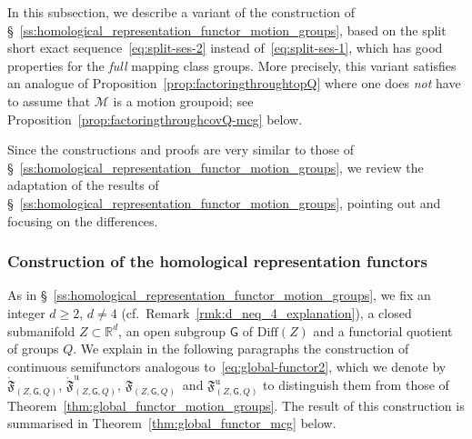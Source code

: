 \documentclass[AHL,Unicode,published]{cedram}
\newcommand{\Diff}{\mathrm{Diff}}
\newcommand{\Int}{\mathring}
\newcommand{\unt}{\mathrm{u}}
\newcommand{\fF}{\mathfrak{F}}
\newcommand{\sG}{\mathsf{G}}
\newcommand{\cM}{\mathcal{M}}
\newcommand{\bR}{\mathbb{R}}
\renewcommand{\geq}{\geqslant}
\begin{document}
In this subsection, we describe a variant of the construction of \S~\ref{ss:homological_representation_functor_motion_groups}, based on the split short exact sequence~\eqref{eq:split-ses-2} instead of~\eqref{eq:split-ses-1}, which has good properties for the \emph{full} mapping class groups. More precisely, this variant satisfies an analogue of Proposition~\ref{prop:factoringthroughtopQ} where one does \emph{not} have to assume that $\cM$ is a motion groupoid; see Proposition~\ref{prop:factoringthroughcovQ-mcg} below.

Since the constructions and proofs are very similar to those of \S~\ref{ss:homological_representation_functor_motion_groups}, we review the adaptation of the results of \S~\ref{ss:homological_representation_functor_motion_groups}, pointing out and focusing on the differences.


\subsubsection{Construction of the homological representation functors}\label{ss:construction_semifunctor_mcg}

As in \S~\ref{ss:homological_representation_functor_motion_groups}, we fix an integer $d \geq 2$, $d \neq 4$ (cf.~Remark~\ref{rmk:d_neq_4_explanation}), a closed submanifold $Z \subset \bR^d$, an open subgroup $\sG$ of $\Diff(Z)$ and a functorial quotient of groups $Q$. We explain in the following paragraphs the construction of continuous semifunctors analogous to~\eqref{eq:global-functor2}, which we denote by $\Int{\fF}_{(Z,\sG,Q)}$, $\Int{\fF}^{\unt}_{(Z,\sG,Q)}$, $\fF_{(Z,\sG,Q)}\, $ and $\fF^{\unt}_{(Z,\sG,Q)}$ to distinguish them from those of Theorem~\ref{thm:global_functor_motion_groups}. The result of this construction is summarised in Theorem~\ref{thm:global_functor_mcg} below.
\end{document}
